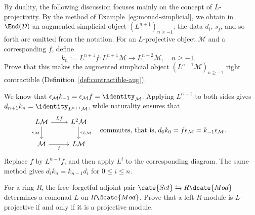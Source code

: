 
	By duality, the following discussion focuses mainly on the concept of
	$L$-projectivity. By the method of Example~\ref{eg:monad-simplicial}, we
	obtain in $\End(\mathcal{D})$ an augmented simplicial object
	$(L^{n+1})_{n\geq-1}$; the data $d_i$, $s_j$, and so forth are omitted
	from the notation. For an $L$-projective object $\mathcal{M}$ and a
	corresponding $f$, define
	\[ k_n := L^{n+1} f : L^{n+1} \mathcal{M} \to L^{n+2} \mathcal{M}, \quad n \geq -1. \]
	Prove that this makes the augmented simplicial object
	$(L^{n+1}\mathcal{M})_{n\geq-1}$ right contractible
	(Definition~\ref{def:contractible-aug}).

	\begin{hint}
		We know that
		$\epsilon_{\mathcal{M}}k_{-1}=\epsilon_{\mathcal{M}}f
		=\identity_{\mathcal{M}}$. Applying $L^{n+1}$ to both sides gives
		$d_{n+1}k_n=\identity_{L^{n+1}\mathcal{M}}$, while naturality ensures
		that
		\[\begin{tikzcd}
			L\mathcal{M} \arrow[r, "Lf"] \arrow[d, "{\epsilon_{\mathcal{M}}}"'] & L^2 \mathcal{M} \arrow[d, "{\epsilon_{L\mathcal{M}}}"] \\
			\mathcal{M} \arrow[r, "f"'] & L\mathcal{M}
		\end{tikzcd} \quad\text{commutes, that is,}\; d_0 k_0 = f\epsilon_{\mathcal{M}} = k_{-1} \epsilon_{\mathcal{M}}. \]
		Replace $f$ by $L^{n-i}f$, and then apply $L^i$ to the corresponding
		diagram. The same method gives
		$d_ik_n=k_{n-1}d_i$ for $0\leq i\leq n$.
	\end{hint}

	\item For a ring $R$, the free--forgetful adjoint pair
	$\cate{Set}\leftrightarrows R\dcate{Mod}$ determines a comonad $L$ on
	$R\dcate{Mod}$. Prove that a left $R$-module is $L$-projective if and
	only if it is a projective module.

